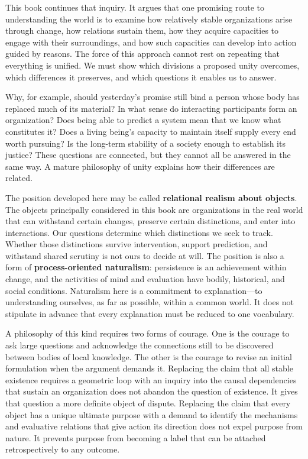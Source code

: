 \documentclass[
  english,
  11pt,
  oneside]{book}
\begin{document}
This book continues that inquiry. It argues that one promising route to understanding the world is to examine how relatively stable organizations arise through change, how relations sustain them, how they acquire capacities to engage with their surroundings, and how such capacities can develop into action guided by reasons. The force of this approach cannot rest on repeating that everything is unified. We must show which divisions a proposed unity overcomes, which differences it preserves, and which questions it enables us to answer.

Why, for example, should yesterday's promise still bind a person whose body has replaced much of its material? In what sense do interacting participants form an organization? Does being able to predict a system mean that we know what constitutes it? Does a living being's capacity to maintain itself supply every end worth pursuing? Is the long-term stability of a society enough to establish its justice? These questions are connected, but they cannot all be answered in the same way. A mature philosophy of unity explains how their differences are related.

The position developed here may be called \textbf{relational realism about objects}. The objects principally considered in this book are organizations in the real world that can withstand certain changes, preserve certain distinctions, and enter into interactions. Our questions determine which distinctions we seek to track. Whether those distinctions survive intervention, support prediction, and withstand shared scrutiny is not ours to decide at will. The position is also a form of \textbf{process-oriented naturalism}: persistence is an achievement within change, and the activities of mind and evaluation have bodily, historical, and social conditions. Naturalism here is a commitment to explanation---to understanding ourselves, as far as possible, within a common world. It does not stipulate in advance that every explanation must be reduced to one vocabulary.

A philosophy of this kind requires two forms of courage. One is the courage to ask large questions and acknowledge the connections still to be discovered between bodies of local knowledge. The other is the courage to revise an initial formulation when the argument demands it. Replacing the claim that all stable existence requires a geometric loop with an inquiry into the causal dependencies that sustain an organization does not abandon the question of existence. It gives that question a more definite object of dispute. Replacing the claim that every object has a unique ultimate purpose with a demand to identify the mechanisms and evaluative relations that give action its direction does not expel purpose from nature. It prevents purpose from becoming a label that can be attached retrospectively to any outcome.
\end{document}
